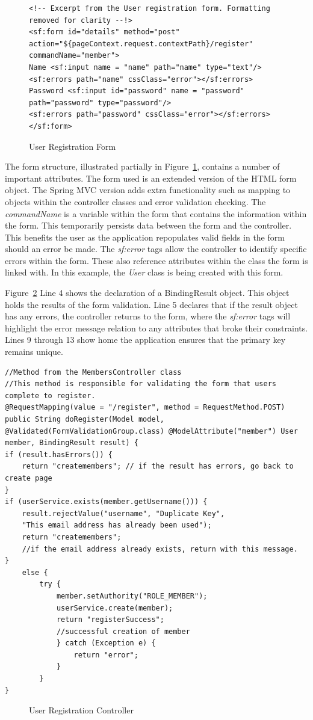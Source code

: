 \begin{figure}[H]
\begin{lstlisting}
<!-- Excerpt from the User registration form. Formatting removed for clarity --!>
<sf:form id="details" method="post" action="${pageContext.request.contextPath}/register" commandName="member">
Name <sf:input name = "name" path="name" type="text"/>
<sf:errors path="name" cssClass="error"></sf:errors>
Password <sf:input id="password" name = "password" path="password" type="password"/>
<sf:errors path="password" cssClass="error"></sf:errors>
</sf:form>
\end{lstlisting}
\caption{User Registration Form}
\label{fig:memberForm}
\end{figure}

The form structure, illustrated partially in Figure~\ref{fig:memberForm}, contains a number of important attributes. The form used is an extended version of the HTML form object. The Spring MVC version adds extra functionality such as mapping to objects within the controller classes and error validation checking. The \textit{commandName} is a variable within the form that contains the information within the form. This temporarily persists data between the form and the controller. This benefits the user as the application repopulates valid fields in the form should an error be made. The \textit{sf:error} tags allow the controller to identify specific errors within the form. These also reference attributes within the class the form is linked with. In this example, the \textit{User} class is being created with this form. 

Figure~\ref{fig:memberController} Line 4 shows the declaration of a BindingResult object. This object holds the results of the form validation. Line 5 declares that if the result object has any errors, the controller returns to the form, where the \textit{sf:error} tags will highlight the error message relation to any attributes that broke their constraints. Lines 9 through 13 show home the application ensures that the primary key remains unique. 

\begin{lstlisting}
//Method from the MembersController class
//This method is responsible for validating the form that users complete to register.
@RequestMapping(value = "/register", method = RequestMethod.POST)
public String doRegister(Model model,
@Validated(FormValidationGroup.class) @ModelAttribute("member") User member, BindingResult result) {
if (result.hasErrors()) {
	return "createmembers"; // if the result has errors, go back to create page
}
if (userService.exists(member.getUsername())) {
	result.rejectValue("username", "Duplicate Key",
	"This email address has already been used");
	return "createmembers";
	//if the email address already exists, return with this message.
}
	else {
		try {
			member.setAuthority("ROLE_MEMBER");
			userService.create(member);
			return "registerSuccess";
			//successful creation of member
			} catch (Exception e) {
				return "error";
			}
		}
}
\end{lstlisting}
\begin{figure}[H]
\caption{User Registration Controller}
\label{fig:memberController}
\end{figure}

